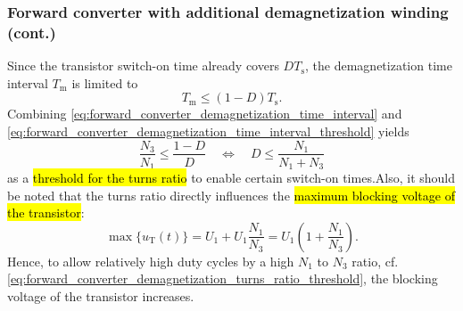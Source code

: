 \begin{frame}
    \frametitle{Forward converter with additional demagnetization winding (cont.)}
    Since the transistor switch-on time already covers $D T_\mathrm{s}$, the demagnetization time interval $T_\mathrm{m}$ is limited to
    \begin{equation}
        T_\mathrm{m} \leq (1-D)T_\mathrm{s}.
        \label{eq:forward_converter_demagnetization_time_interval_threshold}
    \end{equation}\pause
    Combining \eqref{eq:forward_converter_demagnetization_time_interval} and \eqref{eq:forward_converter_demagnetization_time_interval_threshold} yields
    \begin{equation}
        \frac{N_3}{N_1} \leq \frac{1-D}{D} \quad \Leftrightarrow \quad D \leq \frac{N_1}{N_1+N_3}
        \label{eq:forward_converter_demagnetization_turns_ratio_threshold}
    \end{equation}
    as a \hl{threshold for the turns ratio} to enable certain switch-on times.\pause Also, it should be noted that the turns ratio directly influences the \hl{maximum blocking voltage of the transistor}:
    \begin{equation}
        \max\{u_\mathrm{T}(t)\} = U_1 + U_1 \frac{N_1}{N_3} = U_1 \left(1 + \frac{N_1}{N_3}\right). 
    \end{equation}\pause
    Hence, to allow relatively high duty cycles by a high $N_1$ to $N_3$ ratio, cf. \eqref{eq:forward_converter_demagnetization_turns_ratio_threshold}, the blocking voltage of the transistor increases.
\end{frame}

